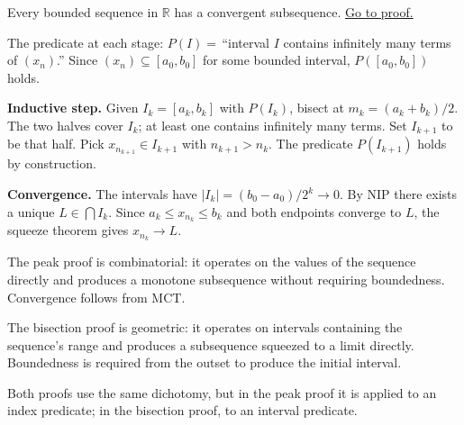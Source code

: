 \begin{proposition}
\label{prop:bw-bisection}
Every bounded sequence in $\mathbb{R}$ has a convergent subsequence.
\hyperref[prf:bw-bisection]{Go to proof.}
\end{proposition}

\begin{remark*}
\end{remark*}


\begin{remark}
The predicate at each stage: $P(I)=\,$``interval $I$ contains infinitely
many terms of $(x_n)$.'' Since $(x_n)\subseteq[a_0,b_0]$ for some bounded
interval, $P([a_0,b_0])$ holds.

\medskip
\noindent\textbf{Inductive step.} Given $I_k=[a_k,b_k]$ with $P(I_k)$,
bisect at $m_k=(a_k+b_k)/2$. The two halves cover $I_k$; at least one
contains infinitely many terms. Set $I_{k+1}$ to be that half. Pick
$x_{n_{k+1}}\in I_{k+1}$ with $n_{k+1}>n_k$. The predicate $P(I_{k+1})$
holds by construction.

\medskip
\noindent\textbf{Convergence.} The intervals have $|I_k|=(b_0-a_0)/2^k\to 0$.
By NIP there exists a unique $L\in\bigcap I_k$. Since
$a_k\leq x_{n_k}\leq b_k$ and both endpoints converge to $L$, the squeeze
theorem gives $x_{n_k}\to L$.
\end{remark}

\begin{remark}
The peak proof is combinatorial: it operates on the values of the sequence
directly and produces a monotone subsequence without requiring boundedness.
Convergence follows from MCT.

The bisection proof is geometric: it operates on intervals containing the
sequence's range and produces a subsequence squeezed to a limit directly.
Boundedness is required from the outset to produce the initial interval.

Both proofs use the same dichotomy, but in the peak proof it is applied to
an index predicate; in the bisection proof, to an interval predicate.
\end{remark}

